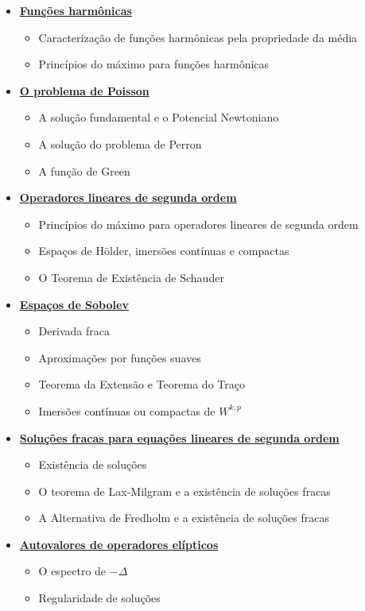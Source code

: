 \begin{itemize}
\begin{itemize}
  \end{itemize}
  \item \underline{\textbf{ Funções harmônicas}}
  \begin{itemize}
    \item Caracterização de funções harmônicas pela propriedade da média
    \item Princípios do máximo para funções harmônicas
  \end{itemize}
  \newpage
  \item \underline{\textbf{ O problema de Poisson}}
  \begin{itemize}
    \item A solução fundamental e o Potencial Newtoniano
    \item A solução do problema de Perron
    \item A função de Green
  \end{itemize}
  \item \underline{\textbf{ Operadores lineares de segunda ordem}}
  \begin{itemize}
    \item Princípios do máximo para operadores lineares de segunda ordem
    \item Espaços de Hölder, imersões contínuas e compactas
    \item O Teorema de Existência de Schauder
  \end{itemize}
  
  \item \underline{\textbf{ Espaços de Sobolev}}
  \begin{itemize}
    \item Derivada fraca
    \item Aproximações por funções suaves
    \item Teorema da Extensão e Teorema do Traço
    \item Imersões contínuas ou compactas de $W^{k,p}$
  \end{itemize}
  \item \underline{\textbf{Soluções fracas para equações lineares de segunda ordem}}
  \begin{itemize}
    \item Existência de soluções
    \item O teorema de Lax-Milgram e a existência de soluções fracas
    \item A Alternativa de Fredholm e a existência de soluções fracas
  \end{itemize}
  \item \underline{\textbf{Autovalores de operadores elípticos}}
  \begin{itemize}
    \item O espectro de $-\Delta$
    \item Regularidade de soluções
  \end{itemize}
\end{itemize}



